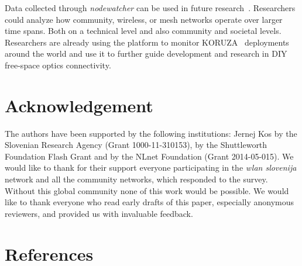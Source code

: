 \documentclass[5p,sort&compress]{elsarticle}
\newcommand{\nodewatcher}{\textit{nodewatcher}}
\newcommand{\wlanslovenija}{\textit{wlan slovenija}}
\begin{document}
Data collected through \nodewatcher{} can be used in future research~\cite{Braem_2013}.
Researchers could analyze how community, wireless, or mesh networks operate over larger time spans.
Both on a technical level and also community and societal levels.
Researchers are already using the platform to monitor KORUZA~\cite{Mustafa_2013} deployments around the world and use it to further guide development and research in DIY free-space optics connectivity.

\section*{Acknowledgement}

The authors have been supported by the following institutions: Jernej Kos by the Slovenian Research Agency (Grant 1000-11-310153), by the Shuttleworth Foundation Flash Grant and by the NLnet Foundation (Grant 2014-05-015).
We would like to thank for their support everyone participating in the \wlanslovenija{} network and all the community networks, which responded to the survey.
Without this global community none of this work would be possible.
We would like to thank everyone who read early drafts of this paper, especially anonymous reviewers, and provided us with invaluable feedback.

\section*{References}

\end{document}
